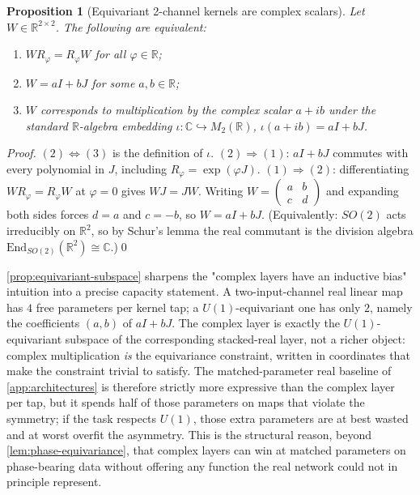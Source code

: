 \documentclass{article}
\providecommand{\Cref}[1]{\autoref{#1}}
\newtheorem{proposition}{Proposition}
\begin{document}
\begin{proposition}[Equivariant 2-channel kernels are complex scalars]
\label{prop:equivariant-subspace}
Let $W\in\mathbb{R}^{2\times 2}$. The following are equivalent:
\begin{enumerate}
  \item $W R_\varphi = R_\varphi W$ for all $\varphi\in\mathbb{R}$;
  \item $W = aI + bJ$ for some $a, b\in\mathbb{R}$;
  \item $W$ corresponds to multiplication by the complex scalar
    $a+ib$ under the standard $\mathbb{R}$-algebra embedding
    $\iota:\mathbb{C}\hookrightarrow M_2(\mathbb{R})$,
    $\iota(a+ib)=aI+bJ$.
\end{enumerate}
\end{proposition}

\begin{proof}
$(2)\Leftrightarrow(3)$ is the definition of $\iota$.
$(2)\Rightarrow(1)$: $aI+bJ$ commutes with every polynomial in $J$,
including $R_\varphi=\exp(\varphi J)$. $(1)\Rightarrow(2)$:
differentiating $W R_\varphi = R_\varphi W$ at $\varphi=0$ gives
$WJ=JW$. Writing $W=\begin{pmatrix}a&b\\c&d\end{pmatrix}$ and
expanding both sides forces $d=a$ and $c=-b$, so $W=aI+bJ$. (Equivalently:
$SO(2)$ acts irreducibly on $\mathbb{R}^2$, so by Schur's lemma the
real commutant is the division algebra
$\mathrm{End}_{SO(2)}(\mathbb{R}^2)\cong\mathbb{C}$.)\qed
\end{proof}

\Cref{prop:equivariant-subspace} sharpens the "complex layers have an
inductive bias" intuition into a precise capacity statement.
A two-input-channel real linear map has $4$ free parameters per kernel
tap; a $U(1)$-equivariant one has only $2$, namely the coefficients
$(a,b)$ of $aI+bJ$. The complex layer is exactly the
$U(1)$-equivariant subspace of the corresponding stacked-real layer,
not a richer object: complex multiplication \emph{is} the equivariance
constraint, written in coordinates that make the constraint trivial
to satisfy. The matched-parameter real baseline of
\Cref{app:architectures} is therefore strictly more expressive than
the complex layer per tap, but it spends half of those parameters on
maps that violate the symmetry; if the task respects $U(1)$, those
extra parameters are at best wasted and at worst overfit the
asymmetry. This is the structural reason, beyond
\Cref{lem:phase-equivariance}, that complex layers can win at matched
parameters on phase-bearing data without offering any function the
real network could not in principle represent.
\end{document}
